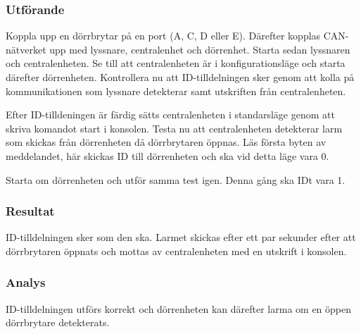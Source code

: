 \subsubsection*{Utförande}
Koppla upp en dörrbrytar på en port (A, C, D eller E). Därefter kopplas CAN-nätverket upp med lyssnare, centralenhet och dörrenhet. Starta sedan lyssnaren och centralenheten. Se till att centralenheten är i konfigurationsläge och starta därefter dörrenheten. Kontrollera nu att ID-tilldelningen sker genom att kolla på kommunikationen som lyssnare detekterar samt utskriften från centralenheten. 

Efter ID-tilldeningen är färdig sätts centralenheten i standarsläge genom att skriva komandot start i konsolen. Testa nu att centralenheten detekterar larm som skickas från dörrenheten då dörrbrytaren öppnas. Läs första byten av meddelandet, här skickas ID till dörrenheten och ska vid detta läge vara 0.

Starta om dörrenheten och utför samma test igen. Denna gång ska IDt vara 1.


\subsubsection*{Resultat}
ID-tilldelningen sker som den ska. Larmet skickas efter ett par sekunder efter att dörrbrytaren öppnats och mottas av centralenheten med en utskrift i konsolen.


\subsubsection*{Analys}
ID-tilldelningen utförs korrekt och dörrenheten kan därefter larma om en öppen dörrbrytare detekterats.


